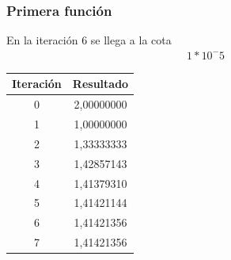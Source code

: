 \documentclass[titlepage,a4paper]{article}
\begin{document}
\subsubsection{Primera función}\label{sec:sec1}
En la iteración 6 se llega a la cota \begin{align}1*10^-5
\end{align}
\begin{tabular}{| c | c |}
\hline
 Iteración & Resultado \\ \hline

    0     & 2,00000000 \\
    1     & 1,00000000 \\
    2     & 1,33333333 \\
    3     & 1,42857143 \\
    4     & 1,41379310 \\
    5     & 1,41421144 \\
    6     & 1,41421356 \\
    7     & 1,41421356 \\
\hline
\end{tabular}
\end{document}
